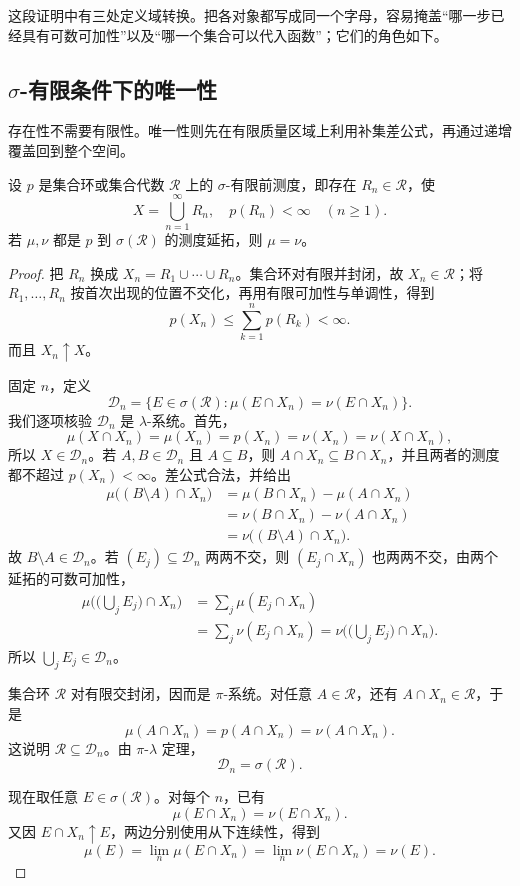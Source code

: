 这段证明中有三处定义域转换。把各对象都写成同一个字母，容易掩盖“哪一步已经具有可数可加性”以及“哪一个集合可以代入函数”；它们的角色如下。



\subsection{\texorpdfstring{\(\sigma\)}{\AnalysisPdfSigma}-有限条件下的唯一性}
\label{b1:subsec:020403}

存在性不需要有限性。唯一性则先在有限质量区域上利用补集差公式，再通过递增覆盖回到整个空间。

\begin{theorem}
\label{b1:thm:sigma-finite-uniqueness}
设 \(p\) 是集合环或集合代数 \(\mathcal R\) 上的 \(\sigma\)-有限前测度，即存在 \(R_n\in\mathcal R\)，使
\[
X=\bigcup_{n=1}^{\infty}R_n,
\quad
p(R_n)<\infty\quad(n\geq1).
\]
若 \(\mu,\nu\) 都是 \(p\) 到 \(\sigma(\mathcal R)\) 的测度延拓，则 \(\mu=\nu\)。
\end{theorem}
\begin{proof}
把 \(R_n\) 换成 \(X_n=R_1\cup\cdots\cup R_n\)。集合环对有限并封闭，故 \(X_n\in\mathcal R\)；将 \(R_1,\ldots,R_n\) 按首次出现的位置不交化，再用有限可加性与单调性，得到
\[
p(X_n)\leq\sum_{k=1}^{n}p(R_k)<\infty.
\]
而且 \(X_n\uparrow X\)。

固定 \(n\)，定义
\[
\mathcal D_n
=\{E\in\sigma(\mathcal R):\mu(E\cap X_n)=\nu(E\cap X_n)\}.
\]
我们逐项核验 \(\mathcal D_n\) 是 \(\lambda\)-系统。首先，
\[
\mu(X\cap X_n)=\mu(X_n)=p(X_n)=\nu(X_n)=\nu(X\cap X_n),
\]
所以 \(X\in\mathcal D_n\)。若 \(A,B\in\mathcal D_n\) 且 \(A\subseteq B\)，则 \(A\cap X_n\subseteq B\cap X_n\)，并且两者的测度都不超过 \(p(X_n)<\infty\)。差公式合法，并给出
\begin{align*}
\mu\bigl((B\setminus A)\cap X_n\bigr)
&=\mu(B\cap X_n)-\mu(A\cap X_n)\\
&=\nu(B\cap X_n)-\nu(A\cap X_n)\\
&=\nu\bigl((B\setminus A)\cap X_n\bigr).
\end{align*}
故 \(B\setminus A\in\mathcal D_n\)。若 \((E_j)\subseteq\mathcal D_n\) 两两不交，则 \((E_j\cap X_n)\) 也两两不交，由两个延拓的可数可加性，
\begin{align*}
\mu\Biggl(\biggl(\bigcup_jE_j\biggr)\cap X_n\Biggr)
&=\sum_j\mu(E_j\cap X_n)\\
&=\sum_j\nu(E_j\cap X_n)
=\nu\Biggl(\biggl(\bigcup_jE_j\biggr)\cap X_n\Biggr).
\end{align*}
所以 \(\bigcup_jE_j\in\mathcal D_n\)。

集合环 \(\mathcal R\) 对有限交封闭，因而是 \(\pi\)-系统。对任意 \(A\in\mathcal R\)，还有 \(A\cap X_n\in\mathcal R\)，于是
\[
\mu(A\cap X_n)=p(A\cap X_n)=\nu(A\cap X_n).
\]
这说明 \(\mathcal R\subseteq\mathcal D_n\)。由 \(\pi\)-\(\lambda\) 定理，
\[
\mathcal D_n=\sigma(\mathcal R).
\]

现在取任意 \(E\in\sigma(\mathcal R)\)。对每个 \(n\)，已有
\[
\mu(E\cap X_n)=\nu(E\cap X_n).
\]
又因 \(E\cap X_n\uparrow E\)，两边分别使用从下连续性，得到
\[
\mu(E)=\lim_n\mu(E\cap X_n)
=\lim_n\nu(E\cap X_n)=\nu(E).
\]
\end{proof}

